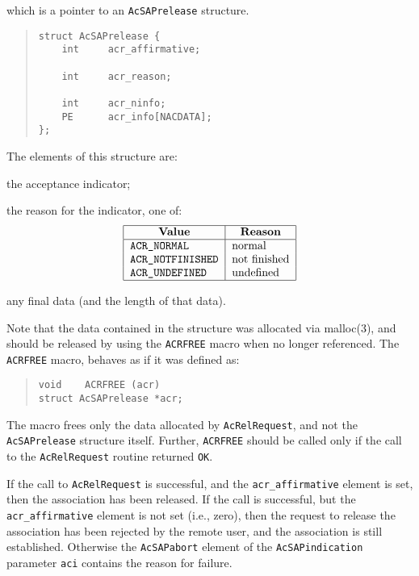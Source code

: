 which is a pointer to an \verb"AcSAPrelease" structure.
\begin{quote}\small\begin{verbatim}
struct AcSAPrelease {
    int     acr_affirmative;

    int     acr_reason;

    int     acr_ninfo;
    PE      acr_info[NACDATA];
};
\end{verbatim}\end{quote}
The elements of this structure are:\label{AcSAPrelease}
\begin{describe}
\item[\verb"acr\_affirmative":]	the acceptance indicator;

\item[\verb"acr\_reason":]	the reason for the indicator,
one of:
\[\begin{tabular}{|l|l|}
\hline
    \multicolumn{1}{|c|}{\bf Value}&
		\multicolumn{1}{c|}{\bf Reason}\\
\hline
    \tt ACR\_NORMAL&		normal\\
    \tt ACR\_NOTFINISHED&	not finished\\
    \tt ACR\_UNDEFINED&		undefined\\
\hline
\end{tabular}\]

\item[\verb"acr\_info"/\verb"acr\_ninfo":]	any final data
(and the length of that data).
\end{describe}
Note that the data contained in the structure was allocated via \man malloc(3),
and should be released by using the \verb"ACRFREE" macro when no longer
referenced.
The \verb"ACRFREE" macro,
behaves as if it was defined as:\label{ACRFREE}
\begin{quote}\small\begin{verbatim}
void    ACRFREE (acr)
struct AcSAPrelease *acr;
\end{verbatim}\end{quote}
The macro frees only the data allocated by \verb"AcRelRequest",
and not the \verb"AcSAPrelease" structure itself.
Further,
\verb"ACRFREE" should be called only if the call to the \verb"AcRelRequest"
routine returned \verb"OK".

If the call to \verb"AcRelRequest" is successful,
and the \verb"acr_affirmative" element is set,
then the association has been released.
If the call is successful,
but the \verb"acr_affirmative" element is not set (i.e., zero),
then the request to release the association has been rejected by the remote
user,
and the association is still established.
Otherwise the \verb"AcSAPabort" element of the \verb"AcSAPindication"
parameter \verb"aci" contains the reason for failure.

